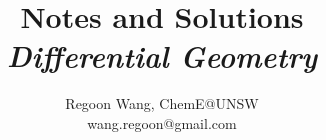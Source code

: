 \documentclass[12pt]{report}
\begin{document}
 
\title{\textbf{Notes and Solutions} \\ \large \textit{Differential Geometry}}
\author{Regoon Wang, ChemE@UNSW \\ wang.regoon@gmail.com} 
 
\maketitle

\tableofcontents

 

 
 
 
 
 

 
 
 

 


 
\end{document}
